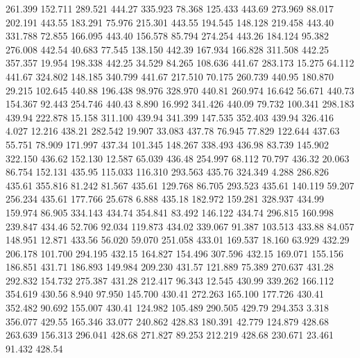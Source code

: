  261.399  152.711  289.521       444.27
 335.923   78.368  125.433       443.69
 273.969   88.017  202.191       443.55
 183.291   75.976  215.301       443.55
 194.545  148.128  219.458       443.40
 331.788   72.855  166.095       443.40
 156.578   85.794  274.254       443.26
 184.124   95.382  276.008       442.54
  40.683   77.545  138.150       442.39
 167.934  166.828  311.508       442.25
 357.357   19.954  198.338       442.25
  34.529   84.265  108.636       441.67
 283.173   15.275   64.112       441.67
 324.802  148.185  340.799       441.67
 217.510   70.175  260.739       440.95
 180.870   29.215  102.645       440.88
 196.438   98.976  328.970       440.81
 260.974   16.642   56.671       440.73
 154.367   92.443  254.746       440.43
   8.890   16.992  341.426       440.09
  79.732  100.341  298.183       439.94
 222.878   15.158  311.100       439.94
 341.399  147.535  352.403       439.94
 326.416    4.027   12.216       438.21
 282.542   19.907   33.083       437.78
  76.945   77.829  122.644       437.63
  55.751   78.909  171.997       437.34
 101.345  148.267  338.493       436.98
  83.739  145.902  322.150       436.62
 152.130   12.587   65.039       436.48
 254.997   68.112   70.797       436.32
  20.063   86.754  152.131       435.95
 115.033  116.310  293.563       435.76
 324.349    4.288  286.826       435.61
 355.816   81.242   81.567       435.61
 129.768   86.705  293.523       435.61
 140.119   59.207  256.234       435.61
 177.766   25.678    6.888       435.18
 182.972  159.281  328.937       434.99
 159.974   86.905  334.143       434.74
 354.841   83.492  146.122       434.74
 296.815  160.998  239.847       434.46
  52.706   92.034  119.873       434.02
 339.067   91.387  103.513       433.88
  84.057  148.951   12.871       433.56
  56.020   59.070  251.058       433.01
 169.537   18.160   63.929       432.29
 206.178  101.700  294.195       432.15
 164.827  154.496  307.596       432.15
 169.071  155.156  186.851       431.71
 186.893  149.984  209.230       431.57
 121.889   75.389  270.637       431.28
 292.832  154.732  275.387       431.28
 212.417   96.343   12.545       430.99
 339.262  166.112  354.619       430.56
   8.940   97.950  145.700       430.41
 272.263  165.100  177.726       430.41
 352.482   90.692  155.007       430.41
 124.982  105.489  290.505       429.79
 294.353    3.318  356.077       429.55
 165.346   33.077  240.862       428.83
 180.391   42.779  124.879       428.68
 263.639  156.313  296.041       428.68
 271.827   89.253  212.219       428.68
 230.671   23.461   91.432       428.54
